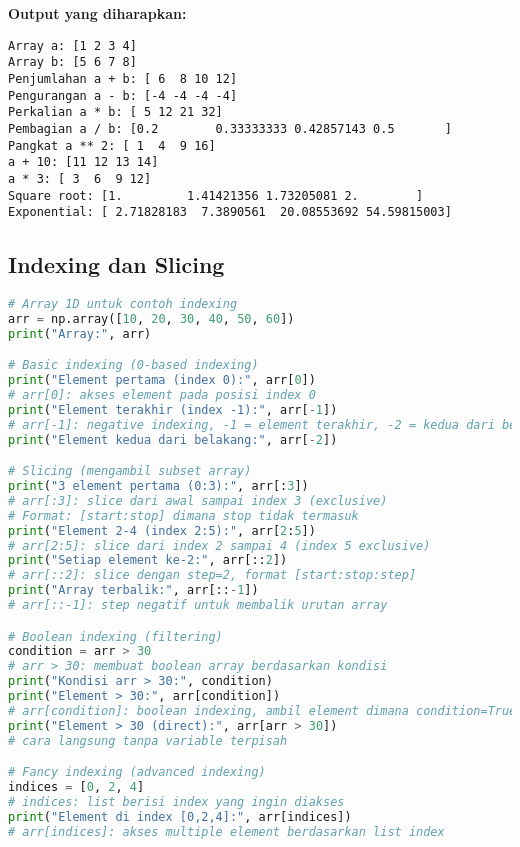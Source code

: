 \textbf{Output yang diharapkan:}
\begin{lstlisting}[style=bash]
Array a: [1 2 3 4]
Array b: [5 6 7 8]
Penjumlahan a + b: [ 6  8 10 12]
Pengurangan a - b: [-4 -4 -4 -4]
Perkalian a * b: [ 5 12 21 32]
Pembagian a / b: [0.2        0.33333333 0.42857143 0.5       ]
Pangkat a ** 2: [ 1  4  9 16]
a + 10: [11 12 13 14]
a * 3: [ 3  6  9 12]
Square root: [1.         1.41421356 1.73205081 2.        ]
Exponential: [ 2.71828183  7.3890561  20.08553692 54.59815003]
\end{lstlisting}

\subsection*{Indexing dan Slicing}

\begin{lstlisting}[language=python, caption={Teknik Akses Data Array}, style=python]
# Array 1D untuk contoh indexing
arr = np.array([10, 20, 30, 40, 50, 60])
print("Array:", arr)

# Basic indexing (0-based indexing)
print("Element pertama (index 0):", arr[0])
# arr[0]: akses element pada posisi index 0
print("Element terakhir (index -1):", arr[-1])
# arr[-1]: negative indexing, -1 = element terakhir, -2 = kedua dari belakang
print("Element kedua dari belakang:", arr[-2])

# Slicing (mengambil subset array)
print("3 element pertama (0:3):", arr[:3])
# arr[:3]: slice dari awal sampai index 3 (exclusive)
# Format: [start:stop] dimana stop tidak termasuk
print("Element 2-4 (index 2:5):", arr[2:5])
# arr[2:5]: slice dari index 2 sampai 4 (index 5 exclusive)
print("Setiap element ke-2:", arr[::2])
# arr[::2]: slice dengan step=2, format [start:stop:step]
print("Array terbalik:", arr[::-1])
# arr[::-1]: step negatif untuk membalik urutan array

# Boolean indexing (filtering)
condition = arr > 30
# arr > 30: membuat boolean array berdasarkan kondisi
print("Kondisi arr > 30:", condition)
print("Element > 30:", arr[condition])
# arr[condition]: boolean indexing, ambil element dimana condition=True
print("Element > 30 (direct):", arr[arr > 30])
# cara langsung tanpa variable terpisah

# Fancy indexing (advanced indexing)
indices = [0, 2, 4]
# indices: list berisi index yang ingin diakses
print("Element di index [0,2,4]:", arr[indices])
# arr[indices]: akses multiple element berdasarkan list index
\end{lstlisting}

